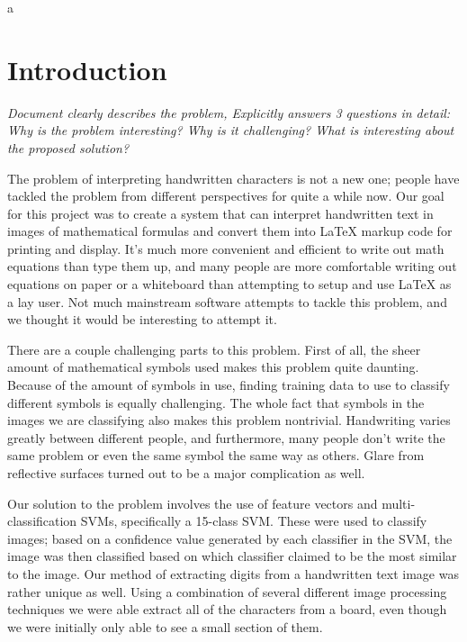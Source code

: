 a\section{Introduction}
\textit{Document clearly describes the problem, Explicitly answers 3 questions in detail: Why is the problem interesting? Why is it challenging? What is interesting about the proposed solution?
}

The problem of interpreting handwritten characters is not a new one; people have tackled the problem from different perspectives for quite a while now.  Our goal for this project was to create a system that can interpret handwritten text in images of mathematical formulas and convert them into LaTeX markup code for printing and display.  It's much more convenient and efficient to write out math equations than type them up, and many people are more comfortable writing out equations on paper or a whiteboard than attempting to setup and use LaTeX as a lay user.  Not much mainstream software attempts to tackle this problem, and we thought it would be interesting to attempt it.

There are a couple challenging parts to this problem.  First of all, the sheer amount of mathematical symbols used makes this problem quite daunting.  Because of the amount of symbols in use, finding training data to use to classify different symbols is equally challenging.  The whole fact that symbols in the images we are classifying also makes this problem nontrivial.  Handwriting varies greatly between different people, and furthermore, many people don't write the same problem or even the same symbol the same way as others.  Glare from reflective surfaces turned out to be a major complication as well.

Our solution to the problem involves the use of feature vectors and multi-classification SVMs, specifically a 15-class SVM.  These were used to classify images; based on a confidence value generated by each classifier in the SVM, the image was then classified based on which classifier claimed to be the most similar to the image.  Our method of extracting digits from a handwritten text image was rather unique as well. Using a combination of several different image processing techniques we were able extract all of the characters from a board, even though we were initially only able to see a small section of them.